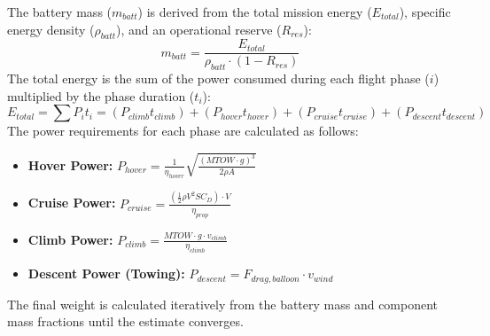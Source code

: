 The battery mass ($m_{batt}$) is derived from the total mission energy ($E_{total}$), specific energy density ($\rho_{batt}$), and an operational reserve ($R_{res}$):
\begin{equation}
    m_{batt} = \frac{E_{total}}{\rho_{batt} \cdot (1 - R_{res})}
\end{equation}
The total energy is the sum of the power consumed during each flight phase ($i$) multiplied by the phase duration ($t_i$):
\begin{equation}
    E_{total} = \sum P_i t_i = (P_{climb} t_{climb}) + (P_{hover} t_{hover}) + (P_{cruise} t_{cruise}) + (P_{descent} t_{descent})
\end{equation}
The power requirements for each phase are calculated as follows:
\begin{itemize}
    \item \textbf{Hover Power:} $P_{hover} = \frac{1}{\eta_{hover}} \sqrt{\frac{(MTOW \cdot g)^3}{2 \rho A}}$ \cite{Leishman2006}
    \item \textbf{Cruise Power:} $P_{cruise} = \frac{(\frac{1}{2} \rho V^2 S C_D) \cdot V}{\eta_{prop}}$
    \item \textbf{Climb Power:} $P_{climb} = \frac{MTOW \cdot g \cdot v_{climb}}{\eta_{climb}}$
    \item \textbf{Descent Power (Towing):} $P_{descent} = F_{drag, balloon} \cdot v_{wind}$
\end{itemize}

The final weight is calculated iteratively from the battery mass and
component mass fractions until the estimate converges.




